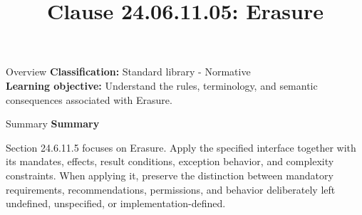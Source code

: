 \documentclass[10pt,letterpaper]{article}
\title{Clause 24.06.11.05: Erasure}
\author{}
\date{}
\begin{document}
\maketitle
\begin{CornellOverviewBox}{Overview}
\textbf{Classification:} Standard library - Normative\\[2pt]
\textbf{Learning objective:} Understand the rules, terminology, and semantic consequences associated with Erasure.
\end{CornellOverviewBox}\begin{CornellSummaryBox}{Summary}
{\sffamily\bfseries\color{Accent} Summary}\par\vspace{3pt}Section 24.6.11.5 focuses on Erasure. Apply the specified interface together with its mandates, effects, result conditions, exception behavior, and complexity constraints. When applying it, preserve the distinction between mandatory requirements, recommendations, permissions, and behavior deliberately left undefined, unspecified, or implementation-defined.
\end{CornellSummaryBox}
\end{document}
